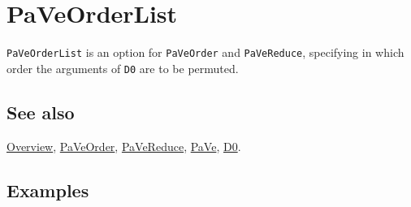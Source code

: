 \documentclass[../FeynCalcManual.tex]{subfiles}
\begin{document}
\hypertarget{paveorderlist}{
\section{PaVeOrderList}\label{paveorderlist}}

\texttt{PaVeOrderList} is an option for \texttt{PaVeOrder} and
\texttt{PaVeReduce}, specifying in which order the arguments of
\texttt{D0} are to be permuted.

\subsection{See also}

\hyperlink{toc}{Overview}, \hyperlink{paveorder}{PaVeOrder},
\hyperlink{pavereduce}{PaVeReduce}, \hyperlink{pave}{PaVe},
\hyperlink{d0}{D0}.

\subsection{Examples}
\end{document}
